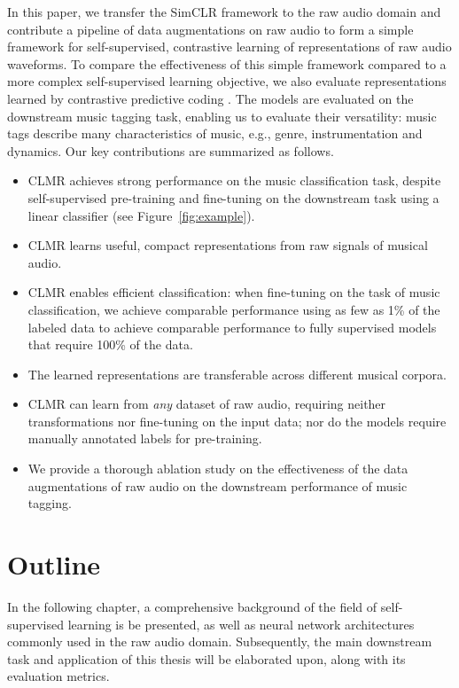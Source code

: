 In this paper, we transfer the SimCLR framework \cite{chen_simple_2020} to the raw audio domain and contribute a pipeline of data augmentations on raw audio to form a simple framework for self-supervised, contrastive  learning of representations of raw audio waveforms.
To compare the effectiveness of this simple framework compared to a more complex self-supervised learning objective, we also evaluate representations learned by contrastive predictive coding \cite{oord_representation_2019}.
The models are evaluated on the downstream music tagging task, enabling us to evaluate their versatility: music tags describe many characteristics of music, e.g., genre, instrumentation and dynamics.
Our key contributions are summarized as follows.
\begin{itemize}
    \item CLMR achieves strong performance on the music classification task, despite self-supervised pre-training and fine-tuning on the downstream task using a linear classifier (see Figure~\ref{fig:example}).
    \item CLMR learns useful, compact representations from raw signals of musical audio.
    \item CLMR enables efficient classification: when fine-tuning on the task of music classification, we achieve comparable performance using as few as 1\% of the labeled data to achieve comparable performance to fully supervised models that require 100\% of the data.
    \item The learned representations are transferable across different musical corpora.
    \item CLMR can learn from \emph{any} dataset of raw audio, requiring neither transformations nor fine-tuning on the input data; nor do the models require manually annotated labels for pre-training.
    \item We provide a thorough ablation study on the effectiveness of the data augmentations of raw audio on the downstream performance of music tagging.
\end{itemize}


\section{Outline}
In the following chapter, a comprehensive background of the field of self-supervised learning is be presented, as well as neural network architectures commonly used in the raw audio domain.
Subsequently, the main downstream task and application of this thesis will be elaborated upon, along with its evaluation metrics.

